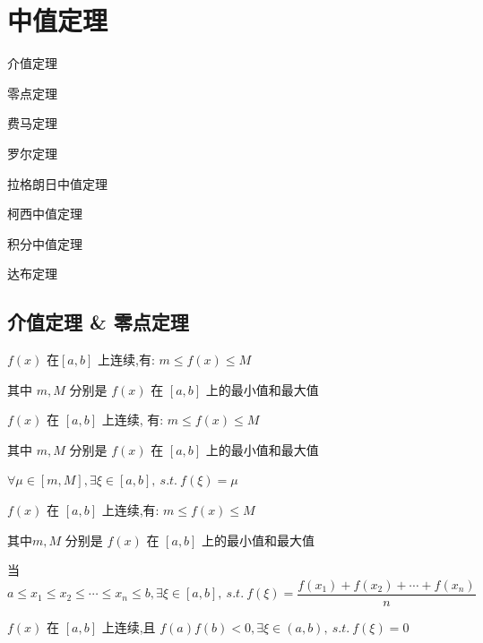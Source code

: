 \chapter{中值定理}
\begin{introduction}
	\item 介值定理
	\item 零点定理
	\item 费马定理
	\item 罗尔定理
	\item 拉格朗日中值定理
	\item 柯西中值定理
	\item 积分中值定理
	\item 达布定理
\end{introduction}
\section{介值定理 \& 零点定理}

\begin{theorem}[有界和最值定理]

	$f(x)$ 在$[a,b]$ 上连续,有: $m\leq f(x)\leq M$

	其中 $m,M$ 分别是 $f(x)$ 在 $[a,b]$ 上的最小值和最大值
\end{theorem}
\begin{theorem}[介值定理]

	$f(x)$ 在 $[a,b]$ 上连续, 有: $m\leq f(x)\leq M$

	其中 $m,M$ 分别是 $f(x)$ 在 $[a,b]$ 上的最小值和最大值

	$\forall \mu\in [m,M],\exists \xi\in[a,b],\ s.t.\ f(\xi)=\mu$
\end{theorem}
\begin{theorem}[平均值定理]

	$f(x)$ 在 $[a,b]$ 上连续,有: $m\leq f(x)\leq M$

	其中$m,M$ 分别是 $f(x)$ 在 $[a,b]$ 上的最小值和最大值

	当 $a\leq x_{1}\leq x_{2}\leq\cdots\leq x_{n}\leq b,\exists \xi\in[a,b],\ s.t.\ f(\xi)=\dfrac{f(x_{1})+f(x_{2})+\cdots+f(x_{n})}{n}$
\end{theorem}
\begin{theorem}[零点定理]

	$f(x)$ 在 $[a,b]$ 上连续,且 $f(a)f(b)<0,\exists \xi\in(a,b),\ s.t.\ f(\xi)=0$
\end{theorem}

